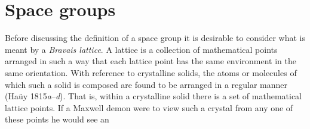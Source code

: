\documentclass[11pt,a4paper,twoside,openright]{book}
\begin{document}
\section{Space groups}

Before discussing the definition of a space group it is desirable to consider what is meant by a \textit{Bravais lattice}. A lattice is a collection of mathematical points arranged in such a way that each lattice point has the same environment in the same orientation. With reference to crystalline solids, the atoms or molecules of which such a solid is composed are found to be arranged in a regular manner (Haüy 1815\textit{a}–\textit{d}). That is, within a crystalline solid there is a set of mathematical lattice points. If a Maxwell demon were to view such a crystal from any one of these points he would see an
\end{document}
